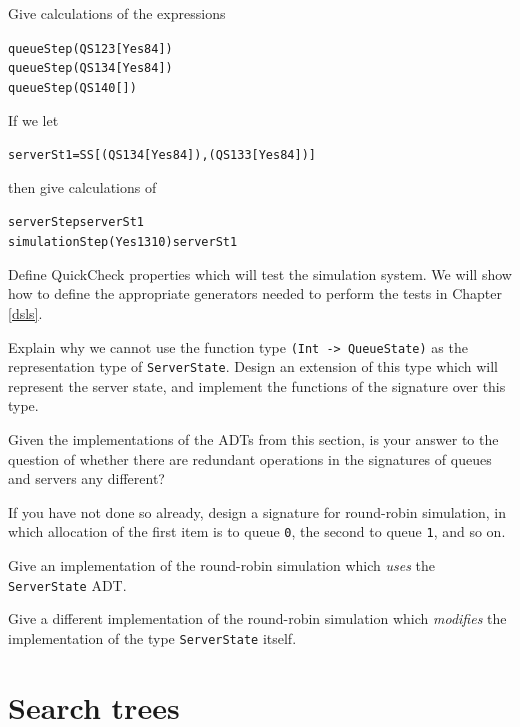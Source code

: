 \begin{exercises} 

\item
Give calculations of the expressions
\begin{alltt}
queueStep (QS 12 3 [Yes 8 4])
queueStep (QS 13 4 [Yes 8 4])
queueStep (QS 14 0 [])
\end{alltt}

\item
If we let
\begin{alltt}
serverSt1 = SS [ (QS 13 4 [Yes 8 4]) , (QS 13 3 [Yes 8 4]) ]
\end{alltt}
then give calculations of 
\begin{alltt}
serverStep serverSt1
simulationStep (Yes 13 10) serverSt1
\end{alltt}


\item
Define QuickCheck properties which will test the simulation system. We will show how to define the appropriate generators needed to perform the tests in Chapter \ref{dsls}.



\item
Explain why we cannot use the function type \texttt{(Int -> QueueState)} as the
representation type of \texttt{ServerState}. Design an extension of this type
which will represent the server state, and implement the functions of the
signature over this type.

\item
Given the implementations of the ADTs from this section,
is your answer to the question of
whether there are redundant operations in the signatures of queues and servers
any different?

\item
If you have not done so already, design a signature for round-robin simulation,
in which allocation of the first item is to queue \texttt{0}, the second to queue
\texttt{1}, and so on. 

\item 
Give an implementation of the round-robin simulation which {\em uses\/} the 
\texttt{ServerState} ADT.

\item
Give a different implementation
of the round-robin simulation which {\em modifies\/}
the implementation of the type \texttt{ServerState} itself.
\end{exercises}


\section{Search trees}
\label{srchTrees}

